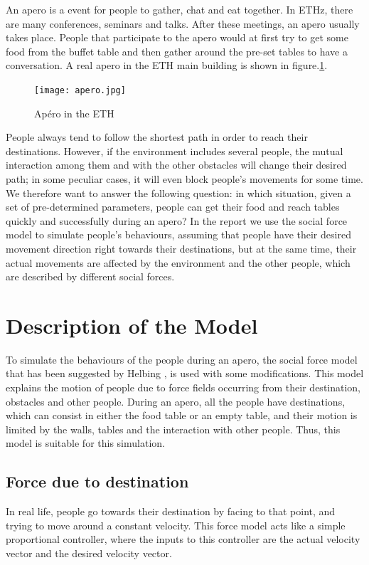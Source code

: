 \documentclass[11pt]{article}
\begin{document}
An apero is a event for people to gather, chat and eat together. In ETHz, there are many conferences, seminars and talks. After these meetings, an apero usually takes place. People that participate to the apero would at first try to get some food from the buffet table and then gather around the pre-set tables to have a conversation. A real apero in the ETH main building is shown in figure.\ref{fig:apero}.

\begin{figure}[h!]
\centering
\texttt{[image: apero.jpg]}
\caption{Apéro in the ETH}
\label{fig:apero}
\end{figure}

People always tend to follow the shortest path in order to reach their destinations. However, if the environment includes several people, the mutual interaction among them and with the other obstacles will change their desired path; in some peculiar cases, it will even block people's movements for some time. We therefore want to answer the following question: in which situation, given a set of pre-determined parameters, people can get their food and reach tables quickly and successfully during an apero? 
In the report we use the social force model to simulate people's behaviours, assuming that people have their desired movement direction right towards their destinations, but at the same time, their actual movements are affected by the environment and the other people, which are described by different social forces.
\section{Description of the Model}
To simulate the behaviours of the people during an apero, the social force model that has been suggested by Helbing \cite{Socialforce}, is used with some modifications. This model explains the motion of people due to force fields occurring from their destination, obstacles and other people. During an apero, all the people have destinations, which can consist in either the food table or an empty table, and their motion is limited by the walls, tables and the interaction with other people. Thus, this model is suitable for this simulation.
\subsection{Force due to destination}
In real life, people go towards their destination by facing to that point, and trying to move around a constant velocity. This force model acts like a simple proportional controller, where the inputs to this controller are the actual velocity vector and the desired velocity vector.
\end{document}
